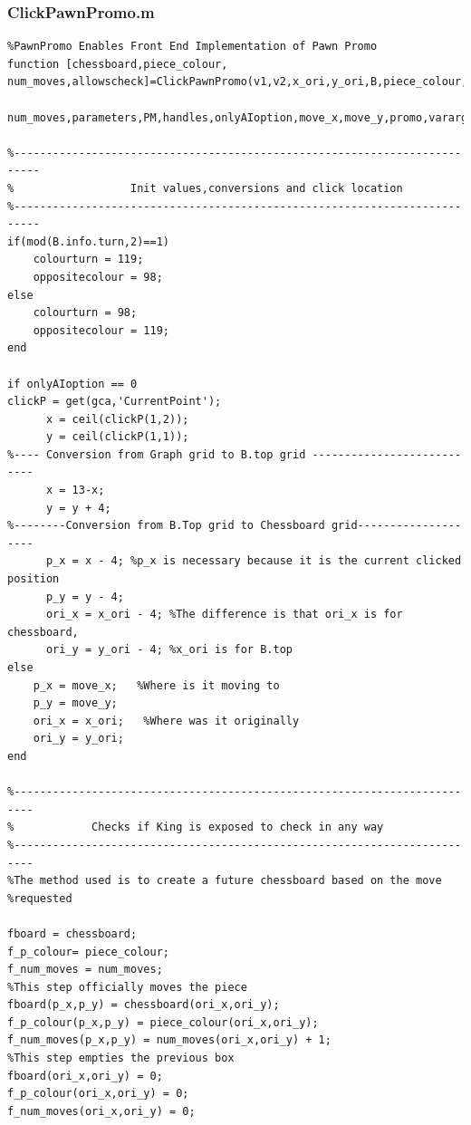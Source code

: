 \documentclass[11pt,a4paper]{article}
\begin{document}
\subsubsection{ClickPawnPromo.m}
\begin{lstlisting}
%PawnPromo Enables Front End Implementation of Pawn Promo
function [chessboard,piece_colour, num_moves,allowscheck]=ClickPawnPromo(v1,v2,x_ori,y_ori,B,piece_colour,chessboard,...
    num_moves,parameters,PM,handles,onlyAIoption,move_x,move_y,promo,varargin)

%--------------------------------------------------------------------------
%                  Init values,conversions and click location
%--------------------------------------------------------------------------
if(mod(B.info.turn,2)==1)
    colourturn = 119;
    oppositecolour = 98;
else
    colourturn = 98;
    oppositecolour = 119;
end

if onlyAIoption == 0
clickP = get(gca,'CurrentPoint');
      x = ceil(clickP(1,2));
      y = ceil(clickP(1,1));
%---- Conversion from Graph grid to B.top grid ---------------------------
      x = 13-x;      
      y = y + 4;
%--------Conversion from B.Top grid to Chessboard grid--------------------
      p_x = x - 4; %p_x is necessary because it is the current clicked position
      p_y = y - 4;
      ori_x = x_ori - 4; %The difference is that ori_x is for chessboard,
      ori_y = y_ori - 4; %x_ori is for B.top
else
    p_x = move_x;   %Where is it moving to
    p_y = move_y;
    ori_x = x_ori;   %Where was it originally
    ori_y = y_ori;
end

%-------------------------------------------------------------------------
%            Checks if King is exposed to check in any way
%-------------------------------------------------------------------------
%The method used is to create a future chessboard based on the move
%requested

fboard = chessboard;
f_p_colour= piece_colour;
f_num_moves = num_moves;
%This step officially moves the piece
fboard(p_x,p_y) = chessboard(ori_x,ori_y);
f_p_colour(p_x,p_y) = piece_colour(ori_x,ori_y);
f_num_moves(p_x,p_y) = num_moves(ori_x,ori_y) + 1;
%This step empties the previous box
fboard(ori_x,ori_y) = 0;
f_p_colour(ori_x,ori_y) = 0;
f_num_moves(ori_x,ori_y) = 0;


\end{lstlisting}
\end{document}
